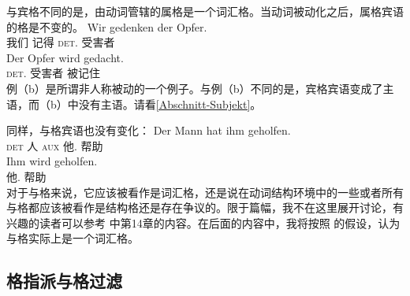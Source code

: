 \noindent
与宾格不同的是，由动词管辖的属格是一个词汇格。当动词被动化之后，属格宾语的格是不变的。
\eal
\ex
\gll Wir gedenken der Opfer.\\
     我们 记得 \textsc{det}.\gen{} 受害者\\
\ex 
\gll Der Opfer wird gedacht.\\
     \textsc{det}.\gen{} 受害者 \passiveprs{} 被记住\\
\zl
例（b）是所谓非人称被动的一个例子。与例（b）不同的是，宾格宾语变成了主语，而（b）中没有主语。请看\ref{Abschnitt-Subjekt}。

同样，与格宾语也没有变化：
\eal
\ex 
\gll Der Mann hat ihm geholfen.\\
     \textsc{det} 人 \textsc{aux} 他.\dat{} 帮助\\
\ex 
\gll Ihm wird geholfen.\\
     他.\dat{} \passiveprs{} 帮助\\
\zl
对于与格来说，它应该被看作是词汇格，还是说在动词结构环境中的一些或者所有与格都应该被看作是结构格还是存在争议的。限于篇幅，我不在这里展开讨论，有兴趣的读者可以参考 中第14章的内容。在后面的内容中，我将按照 \citet[]{Haider86}的假设，认为与格实际上是一个词汇格。 

\subsection{格指派与格过滤}
\label{sec-case-assignment}

